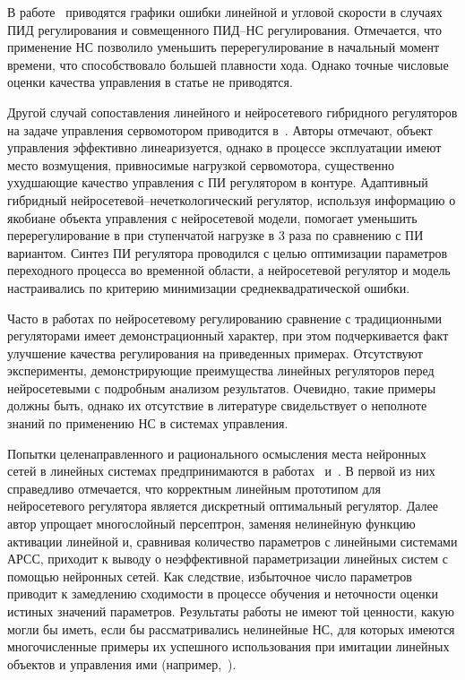 В работе~\cite{boquete99} приводятся графики ошибки линейной и угловой
скорости в случаях ПИД регулирования и совмещенного ПИД--НС
регулирования.  Отмечается, что применение НС позволило уменьшить
перерегулирование в начальный момент времени, что способствовало
большей плавности хода.  Однако точные числовые оценки качества
управления в статье не приводятся.

Другой случай сопоставления линейного и нейросетевого гибридного
регуляторов на задаче управления сервомотором приводится
в~\cite{wailinlin00}.  Авторы отмечают, объект управления эффективно
линеаризуется, однако в процессе эксплуатации имеют место возмущения,
привносимые нагрузкой сервомотора, существенно ухудшающие качество
управления с ПИ регулятором в контуре.  Адаптивный гибридный
нейросетевой--не\-чет\-ко\-ло\-ги\-че\-ский регулятор, используя информацию о
якобиане объекта управления с нейросетевой модели, помогает уменьшить
перерегулирование в при ступенчатой нагрузке в 3 раза по сравнению с
ПИ вариантом.  Синтез ПИ регулятора проводился с целью оптимизации
параметров переходного процесса во временной области, а нейросетевой
регулятор и модель настраивались по критерию минимизации
среднеквадратической ошибки.

Часто в работах по нейросетевому регулированию сравнение с
традиционными регуляторами имеет демонстрационный характер, при этом
подчеркивается факт улучшение качества регулирования на приведенных
примерах.  Отсутствуют эксперименты, демонстрирующие преимущества
линейных регуляторов перед нейросетевыми с подробным анализом
результатов.  Очевидно, такие примеры должны быть, однако их
отсутствие в литературе свидельствует о неполноте знаний по применению
НС в системах управления.

Попытки целенаправленного и рационального осмысления места нейронных
сетей в линейных системах предпринимаются в работах~\cite{warwick96}
и~\cite{toudeft}.  В первой из них справедливо отмечается, что
корректным линейным прототипом для нейросетевого регулятора является
дискретный оптимальный регулятор.  Далее автор упрощает многослойный
персептрон, заменяя нелинейную функцию активации линейной и, сравнивая
количество параметров с линейными системами АРСС, приходит к выводу о
неэффективной параметризации линейных систем с помощью нейронных
сетей.  Как следствие, избыточное число параметров приводит к
замедлению сходимости в процессе обучения и неточности оценки истиных
значений параметров.  Результаты работы не имеют той ценности, какую
могли бы иметь, если бы рассматривались нелинейные НС, для которых
имеются многочисленные примеры их успешного использования при имитации
линейных объектов и управления ими
(например,~\cite{khomyu96}\cite{wailinlin00}\cite{elfil-pta99}).

